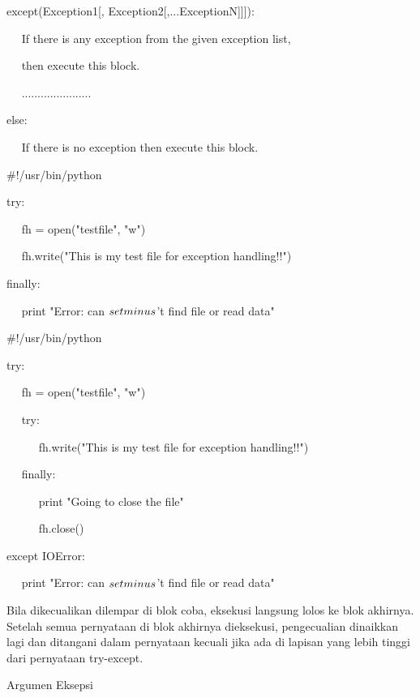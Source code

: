 except(Exception1[, Exception2[,...ExceptionN]]]): \par
~~ If there is any exception from the given exception list,  \par
~~ then execute this block. \par
~~ ...................... \par
else: \par
~~ If there is no exception then execute this block.  \par
\vspace{12pt}
\vspace{12pt}
 $  \#  $!/usr/bin/python \par
\vspace{12pt}
try: \par
~~ fh = open("testfile", "w") \par
~~ fh.write("This is my test file for exception handling!!") \par
finally: \par
~~ print "Error: can $  \\setminus  $'t find file or read data" \par
\vspace{12pt}
\vspace{12pt}
 $  \#  $!/usr/bin/python \par
\vspace{12pt}
try: \par
~~ fh = open("testfile", "w") \par
~~ try: \par
~~~~~ fh.write("This is my test file for exception handling!!") \par
~~ finally: \par
~~~~~ print "Going to close the file" \par
~~~~~ fh.close() \par
except IOError: \par
~~ print "Error: can $  \\setminus  $'t find file or read data" \par
\vspace{12pt}
\vspace{12pt}
Bila dikecualikan dilempar di blok coba, eksekusi langsung lolos ke blok akhirnya. Setelah semua pernyataan di blok akhirnya dieksekusi, pengecualian dinaikkan lagi dan ditangani dalam pernyataan kecuali jika ada di lapisan yang lebih tinggi dari pernyataan try-except. \par
Argumen Eksepsi \par
\vspace{12pt}
